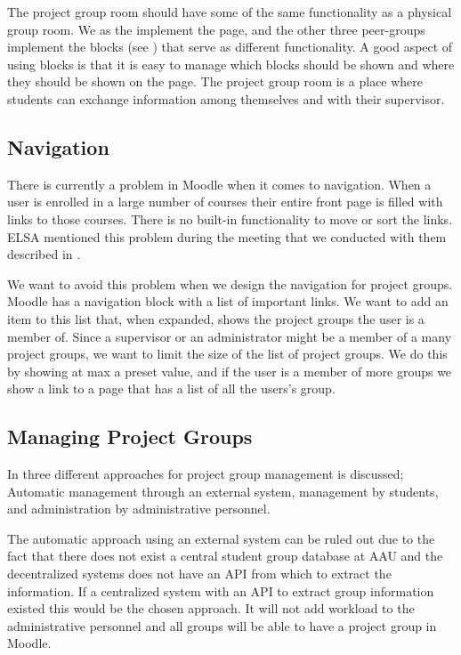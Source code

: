 The project group room should have some of the same functionality as a physical group room.
We as the \groupname{} implement the page, and the other three peer-groups implement the blocks (see ) that serve as different functionality.
A good aspect of using blocks is that it is easy to manage which blocks should be shown and where they should be shown on the page.
The project group room is a place where students can exchange information among themselves and with their supervisor.

\subsection{Navigation}
\label{sub:designprojectgroupnavigation}
There is currently a problem in Moodle when it comes to navigation. 
When a user is enrolled in a large number of courses their entire front page is filled with links to those courses.
There is no built-in functionality to move or sort the links.
ELSA mentioned this problem during the meeting that we conducted with them described in .

We want to avoid this problem when we design the navigation for project groups.
Moodle has a navigation block with a list of important links.
We want to add an item to this list that, when expanded, shows the project groups the user is a member of.
Since a supervisor or an administrator might be a member of a many project groups, we want to limit the size of the list of project groups.
We do this by showing at max a preset value, and if the user is a member of more groups we show a link to a page that has a list of all the users's group.

\subsection{Managing Project Groups}
In  three different approaches for project group management is discussed; Automatic management through an external system, management by students, and administration by administrative personnel. 

The automatic approach using an external system can be ruled out due to the fact that there does not exist a central student group database at AAU and the decentralized systems does not have an API from which to extract the information. 
If a centralized system with an API to extract group information existed this would be the chosen approach.
It will not add workload to the administrative personnel and all groups will be able to have a project group in Moodle. 


